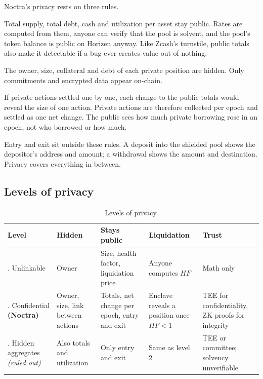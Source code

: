 \documentclass[11pt,a4paper]{article}
\begin{document}
Noctra's privacy rests on three rules.
\begin{description}[leftmargin=0pt, labelsep=0.5em]
  \item[Aggregates are public.] Total supply, total debt, cash and utilization per asset stay public. Rates are
        computed from them, anyone can verify that the pool is solvent, and the pool's token balance is public on
        Horizen anyway. Like Zcash's turnstile, public totals also make it detectable if a bug ever creates value
        out of nothing.
  \item[Positions are private.] The owner, size, collateral and debt of each private position are hidden. Only
        commitments and encrypted data appear on-chain.
  \item[Changes are batched.] If private actions settled one by one, each change to the public totals would
        reveal the size of one action. Private actions are therefore collected per epoch and settled as one net
        change. The public sees how much private borrowing rose in an epoch, not who borrowed or how much.
\end{description}
Entry and exit sit outside these rules. A deposit into the shielded pool shows the depositor's address and
amount; a withdrawal shows the amount and destination. Privacy covers everything in between.

\subsection{Levels of privacy}

\begin{table}[h]
\centering
\caption{Levels of privacy.}
\small
\begin{tabularx}{\textwidth}{@{}>{\raggedright\arraybackslash}p{2.3cm}LLLL@{}}
\toprule
Level & Hidden & Stays public & Liquidation & Trust \\
. Unlinkable & Owner & Size, health factor, liquidation price & Anyone computes $HF$ & Math only \\
. Confidential \textbf{(Noctra)} & Owner, size, link between actions & Totals, net change per epoch, entry and
  exit & Enclave reveals a position once $HF<1$ & TEE for confidentiality, ZK proofs for integrity \\
. Hidden aggregates \textit{(ruled out)} & Also totals and utilization & Only entry and exit & Same as
  level 2 & TEE or committee; solvency unverifiable \\
\bottomrule
\end{tabularx}
\end{table}
\end{document}
